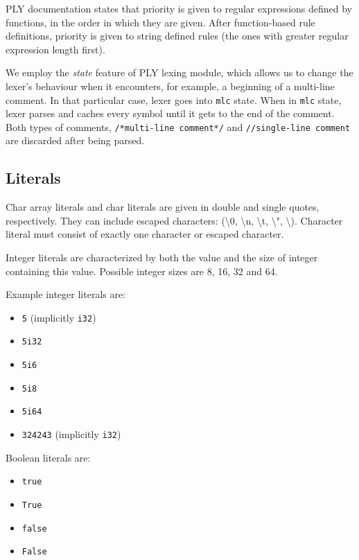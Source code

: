 \documentclass[times, utf8, diplomski]{fer}
\theoremstyle{definition}
\begin{document}
PLY documentation states that priority is given to regular expressions defined by functions, 
in the order in which they are given.
After function-based rule definitions, 
priority is given to string defined rules (the ones with greater regular expression length first).

We employ the \textit{state} feature of PLY lexing module, 
which allows us to change the lexer's behaviour
when it encounters, for example, a beginning of a multi-line comment. 
In that particular case, lexer goes into \texttt{mlc} state.
When in \texttt{mlc} state, lexer parses and caches every 
symbol until it gets to the end of the comment. 
Both types of comments, \texttt{/*multi-line comment*/} and \texttt{//single-line comment} are discarded
after being parsed.

\subsection{Literals}

Char array literals and char literals are given in double and single quotes, respectively.
They can include escaped characters:  (\textbackslash 0, \textbackslash n, \textbackslash t, 
\textbackslash ", \textbackslash \textquotesingle). 
Character literal must consist of exactly one character or escaped character.

Integer literals are characterized by both the value and the size of integer containing this value.
Possible integer sizes are 8, 16, 32 and 64.

Example integer literals are:
\begin{itemize}
    \item \texttt{5} (implicitly \texttt{i32})
    \item \texttt{5i32}
    \item \texttt{5i6}
    \item \texttt{5i8}
    \item \texttt{5i64}
    \item \texttt{324243} (implicitly \texttt{i32})
\end{itemize}

Boolean literals are:

\begin{itemize}
    \item \texttt{true}
    \item \texttt{True}
    \item \texttt{false}
    \item \texttt{False}
\end{itemize}
\end{document}
